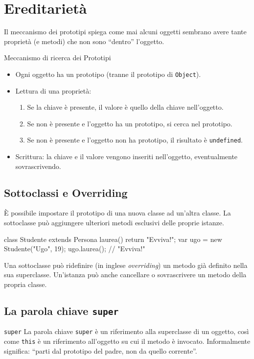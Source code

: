 \section{Ereditarietà}

Il meccanismo dei prototipi spiega come mai alcuni oggetti sembrano avere tante proprietà (e metodi) che non sono ``dentro'' l'oggetto.

\begin{definition}{Meccanismo di ricerca dei Prototipi}
\begin{itemize}
    \item Ogni oggetto ha un prototipo (tranne il prototipo di \texttt{Object}).
    \item Lettura di una proprietà:
    \begin{enumerate}
        \item Se la chiave è presente, il valore è quello della chiave nell'oggetto.
        \item Se non è presente e l'oggetto ha un prototipo, si cerca nel prototipo.
        \item Se non è presente e l'oggetto non ha prototipo, il risultato è \texttt{undefined}.
    \end{enumerate}
    \item Scrittura: la chiave e il valore vengono inseriti nell'oggetto, eventualmente sovrascrivendo.
\end{itemize}
\end{definition}

\subsection{Sottoclassi e Overriding}
È possibile impostare il prototipo di una nuova classe ad un'altra classe. La sottoclasse può aggiungere ulteriori metodi esclusivi delle proprie istanze.

\begin{jsbox}[title={Uso di extends}]
class Studente extends Persona {
  laurea() { return "Evviva!"; }
}
var ugo = new Studente("Ugo", 19);
ugo.laurea(); // "Evviva!"
\end{jsbox}

Una sottoclasse può ridefinire (in inglese \textit{overriding}) un metodo già definito nella sua superclasse. Un'istanza può anche cancellare o sovrascrivere un metodo della propria classe.

\subsection{La parola chiave \texttt{super}}
\begin{definition}{\texttt{super}}
La parola chiave \texttt{super} è un riferimento alla superclasse di un oggetto, così come \texttt{this} è un riferimento all'oggetto su cui il metodo è invocato. Informalmente significa: ``parti dal prototipo del padre, non da quello corrente''.
\end{definition}

